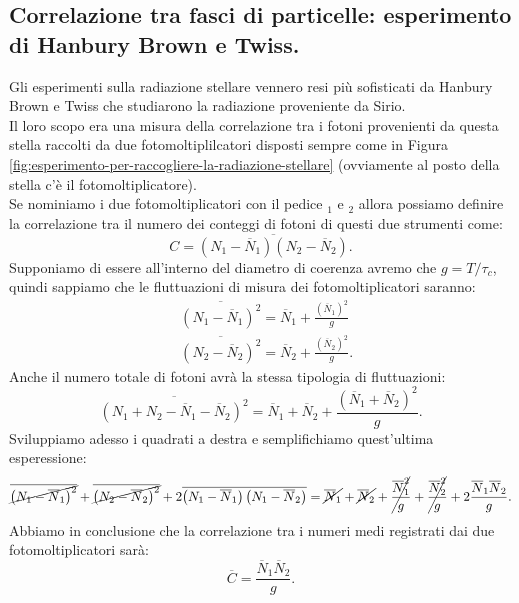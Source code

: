 \subsection{Correlazione tra fasci di particelle: esperimento di Hanbury Brown e Twiss.}
\label{subsec:Correlazione tra fasci di particelle}
Gli esperimenti sulla radiazione stellare vennero resi più sofisticati da Hanbury Brown e Twiss che studiarono la radiazione proveniente da Sirio.\\
Il loro scopo era una misura della correlazione tra i fotoni provenienti da questa stella raccolti da due fotomoltiplilcatori disposti sempre come in Figura \ref{fig:esperimento-per-raccogliere-la-radiazione-stellare} (ovviamente al posto della stella c'è il fotomoltiplicatore). \\
Se nominiamo i due fotomoltiplicatori con il pedice $_1$ e  $_2$ allora possiamo definire la correlazione tra il numero dei conteggi di fotoni di questi due strumenti come:
\[
	C = \overline{\left( N_1 - \overline{N}_1\right) \left( N_2-\overline{N}_2 \right)}
.\] 
Supponiamo di essere all'interno del diametro di coerenza avremo che $g = T /\tau_c$, quindi sappiamo che le fluttuazioni di misura dei fotomoltiplicatori saranno:
\[\begin{aligned}
	&\overline{\left( N_1-\overline{N}_1 \right)^2} 
	= 
	\overline{N}_1 + \frac{\left( \overline{N}_1 \right)^2}{g}\\
	&\overline{\left( N_2-\overline{N}_2 \right)^2} 
	= 
	\overline{N}_2 + \frac{\left( \overline{N}_2 \right)^2}{g}
.\end{aligned}\]
Anche il numero totale di fotoni avrà la stessa tipologia di fluttuazioni:
\[
	\overline{\left( N_1+N_2-\overline{N}_1-\overline{N}_2 \right)^2}
	=
	\overline{N}_1 + \overline{N}_2
	+
	\frac{\left( \overline{N}_1 + \overline{N}_2 \right)^2}{g}
.\] 
Sviluppiamo adesso i quadrati a destra e semplifichiamo quest'ultima esperessione:
\[\begin{aligned}
	\cancel{\overline{\left( N_1-\overline{N}_1 \right)^2}} 
	+
	\cancel{\overline{\left( N_2-\overline{N}_2 \right)^2}}
	+ 2 
	\overline{\left( N_1-\overline{N}_1 \right) \left( N_1-\overline{N}_2 \right) }
	=
	\cancel{\overline{N}_1} + \cancel{\overline{N}_2}
	+
	\cancel{\frac{\overline{N}_1^2}{g}} + \cancel{\frac{\overline{N}_2^2}{g}}
	+
	2 \frac{\overline{N}_1 \overline{N}_2}{g}
.\end{aligned}\]
Abbiamo in conclusione che la correlazione tra i numeri medi registrati dai due fotomoltiplicatori sarà:
\[
	\overline{C} = \frac{\overline{N}_1 \overline{N}_2}{g} 
.\] 
